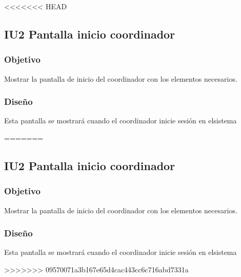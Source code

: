 <<<<<<< HEAD
\subsection{IU2 Pantalla inicio coordinador}

\subsubsection{Objetivo}
	Mostrar la pantalla de inicio del coordinador con los elementos necesarios.

\subsubsection{Diseño}
	Esta pantalla se mostrará cuando el coordinador inicie sesión en elsistema

=======
\subsection{IU2 Pantalla inicio coordinador}

\subsubsection{Objetivo}
	Mostrar la pantalla de inicio del coordinador con los elementos necesarios.

\subsubsection{Diseño}
	Esta pantalla se mostrará cuando el coordinador inicie sesión en elsistema

>>>>>>> 09570071a3b167e65d4cac443cc6c716abd7331a
